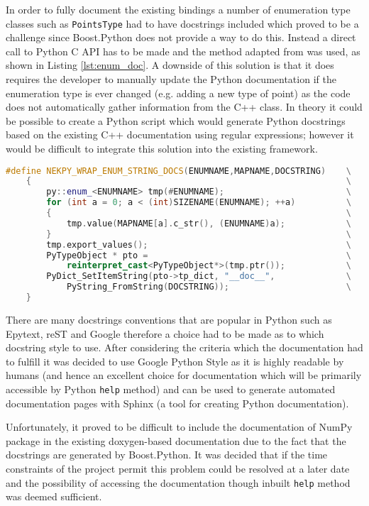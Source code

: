In order to fully document the existing bindings a number of enumeration type classes such 
as \texttt{PointsType} had to have docstrings included which proved to be a challenge 
since Boost.Python does not provide a way to do this. Instead a direct call to Python C API 
has to be made and the method adapted from \cite{PythonEnumDocstring} was used, as shown in 
Listing \ref{lst:enum_doc}. A downside of this solution is that it does requires the developer 
to manually update the Python documentation if the enumeration type is ever changed (e.g. 
adding a new type of point) as the code does not automatically gather information from the 
C++ class. In theory it could be possible to create a Python script which would generate Python 
docstrings based on the existing C++ documentation using regular expressions; however it would 
be difficult to integrate this solution into the existing framework.

\begin{lstlisting}[caption={Code used to include dosctings in enumetation type classes - part of \texttt{NekPyConfig.hpp}}, label={lst:enum_doc}, language=C++]
#define NEKPY_WRAP_ENUM_STRING_DOCS(ENUMNAME,MAPNAME,DOCSTRING)    \
    {                                                              \
        py::enum_<ENUMNAME> tmp(#ENUMNAME);                        \
        for (int a = 0; a < (int)SIZENAME(ENUMNAME); ++a)          \
        {                                                          \
            tmp.value(MAPNAME[a].c_str(), (ENUMNAME)a);            \
        }                                                          \
        tmp.export_values();                                       \
        PyTypeObject * pto =                                       \
            reinterpret_cast<PyTypeObject*>(tmp.ptr());            \
        PyDict_SetItemString(pto->tp_dict, "__doc__",              \
            PyString_FromString(DOCSTRING));                       \
    }
\end{lstlisting}

There are many docstrings conventions that are popular in Python such as Epytext, reST and 
Google therefore a choice had to be made as to which docstring style to use. After considering 
the criteria which the documentation had to fulfill it was decided to use Google Python Style 
\cite{PythonGoogle} as it is highly readable by humans (and hence an excellent choice for 
documentation which will be primarily accessible by Python \texttt{help} method) and can be 
used to generate automated documentation pages with Sphinx (a tool for creating Python documentation). 

Unfortunately, it proved to be difficult to include the documentation of NumPy package in the 
existing doxygen-based documentation due to the fact that the docstrings are generated by Boost.Python. 
It was decided that if the time constraints of the project permit this problem could be resolved 
at a later date and the possibility of accessing the documentation though inbuilt \texttt{help} 
method was deemed sufficient.
